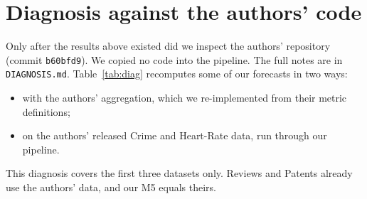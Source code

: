 \begin{table}[h!]\centering\scriptsize\setlength\tabcolsep{3pt}

\caption{Checks on the forecasts returned from the M2 Max. Source: \texttt{results/stage1\_validity/}. TSFM rows
re-forecast the first windows on our CPU at the pinned revision and compare quantiles (max relative error), the
coverage indicators $\mathbf 1\{y\le\hat y^q\}$ and the pooled PCE over the same windows. ARIMA rows give the
re-forecast error on 32 windows ($^\S$platform-dependent optimiser, see text) and the dataset PCE of the full
re-run on x86. N-BEATS: grid complete, selected configuration is the argmin of the selection WQL.}
\label{tab:validity}
\end{table}

\section{Diagnosis against the authors' code}
\label{sec:diag}

Only after the results above existed did we inspect the authors' repository\supercite{authorsrepo}
(commit \texttt{b60bfd9}). We copied no code into the pipeline. The full notes are in \texttt{DIAGNOSIS.md}.
Table~\ref{tab:diag} recomputes some of our forecasts in two ways:
\begin{itemize}
\item with the authors' aggregation, which we re-implemented from their metric definitions;
\item on the authors' released Crime and Heart-Rate data, run through our pipeline.
\end{itemize}
This diagnosis covers the first three datasets only. Reviews and Patents already use the authors' data, and our M5
equals theirs.

\begin{table}[h!]\centering\scriptsize\setlength\tabcolsep{3pt}

\caption{Diagnosis only. ``authors' agg.'' = PCE pooled over the whole dataset; MASE with a global in-sample naive
denominator, clipped at 50 (authors' \texttt{src/metrics.py}). Sources: \texttt{results/diagnosis\_authors\_style\_metrics.csv} and
\texttt{results/summary.csv} (rows \texttt{*\_authorsdata}).}
\label{tab:diag}
\end{table}


